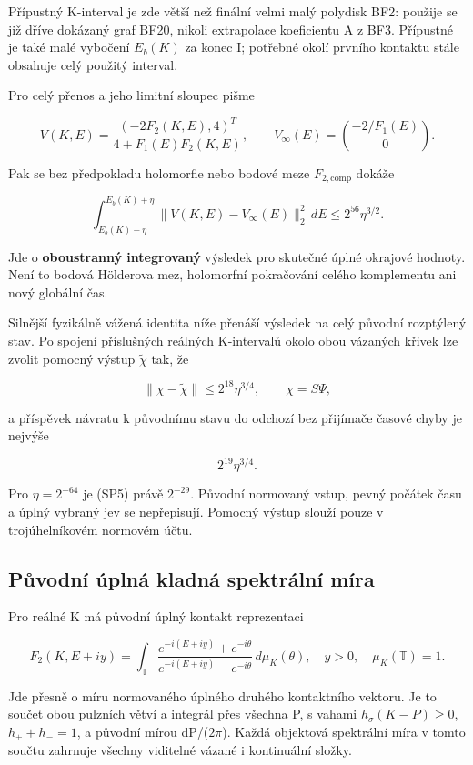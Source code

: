 \documentclass[11pt,a4paper]{article}
\theoremstyle{remark}\newtheorem{remark}[theorem]{Poznámka}
\numberwithin{equation}{section}
\begin{document}
Přípustný K-interval je zde větší než finální velmi malý polydisk BF2:
použije se již dříve dokázaný graf BF20, nikoli extrapolace koeficientu
A z BF3. Přípustné je také malé vybočení \(E_b(K)\) za konec I; potřebné
okolí prvního kontaktu stále obsahuje celý použitý interval.

Pro celý přenos a jeho limitní sloupec pišme

\[
V(K,E)=\frac{(-2F_2(K,E),4)^T}{4+F_1(E)F_2(K,E)},
\qquad V_\infty(E)=\binom{-2/F_1(E)}{0}.
\tag{SP2}
\]

Pak se bez předpokladu holomorfie nebo bodové meze
\(F_{2,\mathrm{comp}}\) dokáže

\[
\boxed{
\int_{E_b(K)-\eta}^{E_b(K)+\eta}
\|V(K,E)-V_\infty(E)\|_2^2\,dE
\le2^{56}\eta^{3/2}.}
\tag{SP3}
\]

Jde o \textbf{oboustranný integrovaný} výsledek pro skutečné úplné
okrajové hodnoty. Není to bodová Hölderova mez, holomorfní pokračování
celého komplementu ani nový globální čas.

Silnější fyzikálně vážená identita níže přenáší výsledek na celý původní
rozptýlený stav. Po spojení příslušných reálných K-intervalů okolo obou
vázaných křivek lze zvolit pomocný výstup \(\widetilde\chi\) tak, že

\[
\boxed{\|\chi-\widetilde\chi\|\le2^{18}\eta^{3/4},
\qquad \chi=S\Psi,}
\tag{SP4}
\]

a příspěvek návratu k původnímu stavu do odchozí bez přijímače časové
chyby je nejvýše

\[
\boxed{2^{19}\eta^{3/4}.}
\tag{SP5}
\]

Pro \(\eta=2^{-64}\) je (SP5) právě \(2^{-29}\). Původní normovaný
vstup, pevný počátek času a úplný vybraný jev se nepřepisují. Pomocný
výstup slouží pouze v trojúhelníkovém normovém účtu.

\hypertarget{pux16fvodnuxed-uxfaplnuxe1-kladnuxe1-spektruxe1lnuxed-muxedra}{%
\subsection{Původní úplná kladná spektrální
míra}\label{pux16fvodnuxed-uxfaplnuxe1-kladnuxe1-spektruxe1lnuxed-muxedra}}

Pro reálné K má původní úplný kontakt reprezentaci

\[
F_2(K,E+i y)=\int_{\mathbb T}
\frac{e^{-i(E+i y)}+e^{-i\theta}}
{e^{-i(E+i y)}-e^{-i\theta}}\,d\mu_K(\theta),
\quad y>0,\quad \mu_K(\mathbb T)=1.
\tag{SP6}
\]

Jde přesně o míru normovaného úplného druhého kontaktního vektoru. Je to
součet obou pulzních větví a integrál přes všechna P, s vahami
\(h_\sigma(K-P)\ge0\), \(h_++h_-=1\), a původní mírou dP/(\(2\pi\)).
Každá objektová spektrální míra v tomto součtu zahrnuje všechny
viditelné vázané i kontinuální složky.
\end{document}

